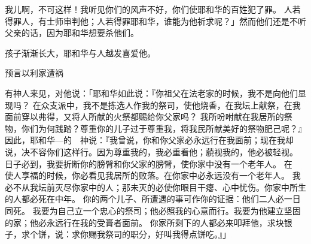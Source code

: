 {我儿啊，不可这样！我听见你们的风声不好，你们使耶和华的百姓犯了罪。
人若得罪人，有士师审判他；人若得罪耶和华，谁能为他祈求呢？」然而他们还是不听父亲的话，因为耶和华想要杀他们。
\par }{\PP {}孩子{}渐渐长大，耶和华与人越发喜爱他。
\par }{\SH 预言以利家遭祸
\par }{\PP {}有神人来见{}，对他说：「耶和华如此说：『你祖父在{}法老家{}的时候，我不是向他们显现吗？
在{}众支派中，我不是拣选人作我的祭司，使他烧香，在我坛上献祭，在我面前穿以弗得，又将{}人所献的火祭都赐给你父家吗？
我所吩咐献在我居所的祭物，你们为何践踏？尊重你的儿子过于尊重我，将我民{}所献美好的祭物肥己呢？』
因此，耶和华—{}的　神说：『我曾说，你和你父家必永远行在我面前；现在我却说，决不容你们这样行。因为尊重我的，我必重看他；藐视我的，他必被轻视。
日子必到，我要折断你的膀臂和你父家的膀臂，使你家中没有一个老年人。
在　{}使{}人享福的时候，你必看见我居所的败落。在你家中必永远没有一个老年人。
我必不从我坛前灭尽你家中的人；那未灭的必使你眼目干瘪、心中忧伤。你家中所生的人都必死在中年。
你的两个儿子{}、{}所遭遇的事可作你的证据：他们二人必一日同死。
我要为自己立一个忠心的祭司；他必照我的心意而行。我要为他建立坚固的家；他必永远行在我的受膏者面前。
你家所剩下的人都必来叩拜他，求块银子，求个饼，说：求你赐我祭司的职分，好叫我得点饼吃。』」

}

